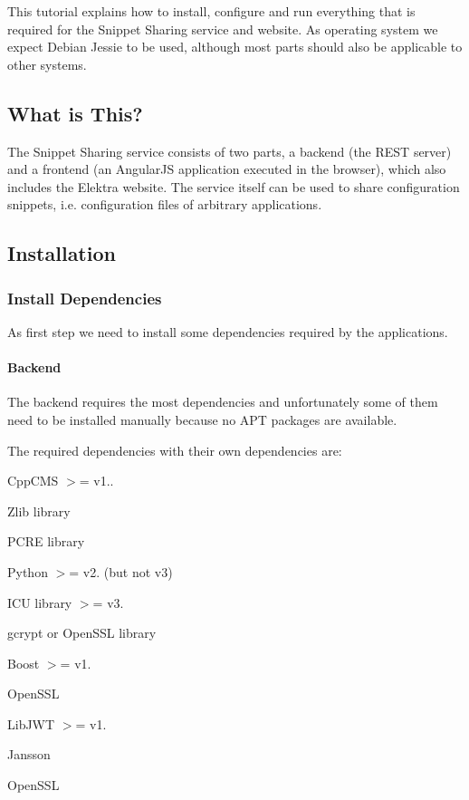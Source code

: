 This tutorial explains how to install, configure and run everything that is required for the Snippet Sharing service and website. As operating system we expect Debian Jessie to be used, although most parts should also be applicable to other systems.

\subsection*{What is This?}

The Snippet Sharing service consists of two parts, a backend (the R\+E\+ST server) and a frontend (an Angular\+JS application executed in the browser), which also includes the Elektra website. The service itself can be used to share configuration snippets, i.\+e. configuration files of arbitrary applications.

\subsection*{Installation}

\subsubsection*{Install Dependencies}

As first step we need to install some dependencies required by the applications.

\paragraph*{Backend}

The backend requires the most dependencies and unfortunately some of them need to be installed manually because no A\+PT packages are available.

The required dependencies with their own dependencies are\+:


\begin{DoxyItemize}
\item Cpp\+C\+MS $>$= v1..
\begin{DoxyItemize}
\item Zlib library
\item P\+C\+RE library
\item Python $>$= v2. (but not v3)
\item I\+CU library $>$= v3.
\item gcrypt or Open\+S\+SL library
\end{DoxyItemize}
\item Boost $>$= v1.
\item Open\+S\+SL
\item Lib\+J\+WT $>$= v1.
\begin{DoxyItemize}
\item Jansson
\item Open\+S\+SL
\end{DoxyItemize}
\end{DoxyItemize}


